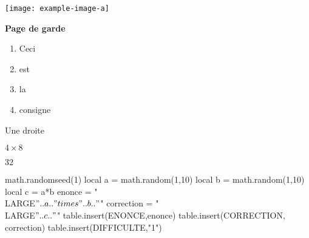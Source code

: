 \documentclass{classe-tex3R}
\begin{document}

\begin{enonce}
  \begin{center}
    \texttt{[image: example-image-a]} 
  \end{center} 

  \medskip

  \textbf{Page de garde}
\end{enonce}

\begin{correction}
  \begin{enumerate}
    \item Ceci
    \item est
    \item la
    \item consigne
  \end{enumerate}
\end{correction}


\begin{enonce}



\end{enonce}

\begin{correction}
  Une droite
\end{correction}


\begin{enonce}
  \LARGE $4\times 8$
\end{enonce}

\begin{correction}
  \LARGE $32$
\end{correction}

  \begin{luacode*}
    math.randomseed(1) 
    local a = math.random(1,10)
    local b = math.random(1,10)
    local c = a*b
    enonce = "\\LARGE$" .. a .. "\\times" .. b .. "$"
    correction = "\\LARGE$" .. c .. "$"
    table.insert(ENONCE,enonce)
    table.insert(CORRECTION, correction)
    table.insert(DIFFICULTE,"1")
  \end{luacode*}
\end{document}
